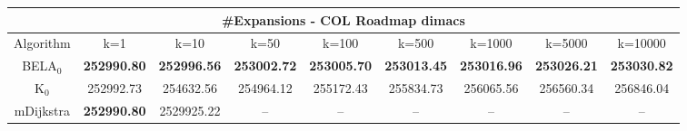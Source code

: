 \begin{tabular}{c|cccccccc}\toprule
\multicolumn{9}{c}{#Expansions - COL Roadmap dimacs}\\ \midrule
Algorithm & k=1 & k=10 & k=50 & k=100 & k=500 & k=1000 & k=5000 & k=10000 \\ \midrule
BELA$_0$ & \textbf{252990.80} & \textbf{252996.56} & \textbf{253002.72} & \textbf{253005.70} & \textbf{253013.45} & \textbf{253016.96} & \textbf{253026.21} & \textbf{253030.82} \\
K$_0$ & 252992.73 & 254632.56 & 254964.12 & 255172.43 & 255834.73 & 256065.56 & 256560.34 & 256846.04 \\
mDijkstra & \textbf{252990.80} & 2529925.22 & -- & -- & -- & -- & -- & -- \\ \bottomrule 
\end{tabular}
